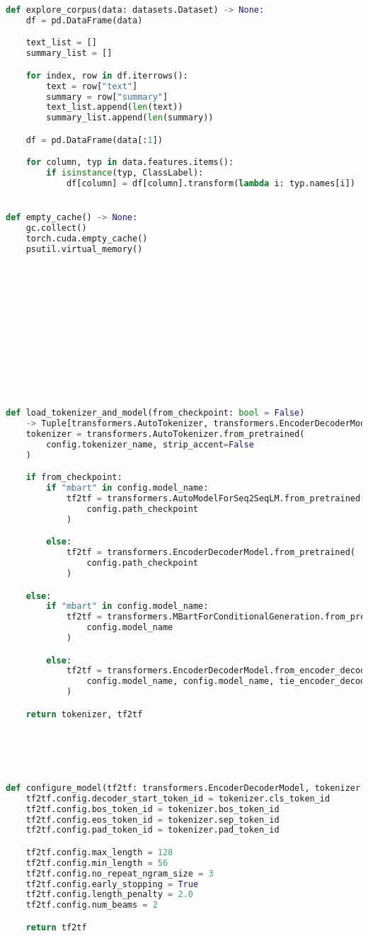 \begin{lstlisting}[language=Python, caption=Hilfsmethoden]
def explore_corpus(data: datasets.Dataset) -> None:
    df = pd.DataFrame(data)

    text_list = []
    summary_list = []

    for index, row in df.iterrows():
        text = row["text"]
        summary = row["summary"]
        text_list.append(len(text))
        summary_list.append(len(summary))

    df = pd.DataFrame(data[:1])

    for column, typ in data.features.items():
        if isinstance(typ, ClassLabel):
            df[column] = df[column].transform(lambda i: typ.names[i])


def empty_cache() -> None:
    gc.collect()
    torch.cuda.empty_cache()
    psutil.virtual_memory()













def load_tokenizer_and_model(from_checkpoint: bool = False)
	-> Tuple[transformers.AutoTokenizer, transformers.EncoderDecoderModel]:
    tokenizer = transformers.AutoTokenizer.from_pretrained(
        config.tokenizer_name, strip_accent=False
    )

    if from_checkpoint:
        if "mbart" in config.model_name:
            tf2tf = transformers.AutoModelForSeq2SeqLM.from_pretrained(
                config.path_checkpoint
            )

        else:
            tf2tf = transformers.EncoderDecoderModel.from_pretrained(
                config.path_checkpoint
            )

    else:
        if "mbart" in config.model_name:
            tf2tf = transformers.MBartForConditionalGeneration.from_pretrained(
                config.model_name
            )

        else:
            tf2tf = transformers.EncoderDecoderModel.from_encoder_decoder_pretrained(
                config.model_name, config.model_name, tie_encoder_decoder=True
            )

    return tokenizer, tf2tf
    
    
    
    
    
    
def configure_model(tf2tf: transformers.EncoderDecoderModel, tokenizer: transformers.AutoTokenizer):
    tf2tf.config.decoder_start_token_id = tokenizer.cls_token_id
    tf2tf.config.bos_token_id = tokenizer.bos_token_id
    tf2tf.config.eos_token_id = tokenizer.sep_token_id
    tf2tf.config.pad_token_id = tokenizer.pad_token_id

    tf2tf.config.max_length = 128
    tf2tf.config.min_length = 56
    tf2tf.config.no_repeat_ngram_size = 3
    tf2tf.config.early_stopping = True
    tf2tf.config.length_penalty = 2.0
    tf2tf.config.num_beams = 2

    return tf2tf
\end{lstlisting}
\newpage


